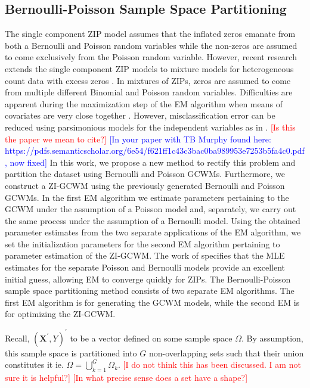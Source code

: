 \documentclass[11pt,letterpaper]{article}
\numberwithin{equation}{section}
\numberwithin{equation}{section}
\numberwithin{equation}{section}
\begin{document}
\subsection{Bernoulli-Poisson Sample Space Partitioning}

The single component ZIP model assumes that the inflated zeros emanate from both a Bernoulli and Poisson random variables while the non-zeros are assumed to come exclusively from the Poisson random variable. However, recent research  extends the single component ZIP models to mixture models for heterogeneous count data with excess zeros \citep[see][]{Bermudez+Karlis:2012}. In mixtures of ZIPs, zeros are assumed to come from multiple different Binomial and Poisson random variables. Difficulties are apparent  during the maximization step of the EM algorithm when means of covariates are very close together \cite[see][]{LimHwa}. However, misclassification error can be reduced using parsimonious models for the independent variables as in  \cite{McNicholas:2010}. \textcolor{red}{[Is this the paper we mean to cite?]} \textcolor{blue}{[In your paper with  TB Murphy found here: https://pdfs.semanticscholar.org/6e54/f621ff1c43c3bac0ba989953e7253b5fa4c0.pdf, now fixed]
}
	In this work, we propose a new method to rectify this problem and partition the dataset using Bernoulli and Poisson GCWMs. Furthermore, we construct a ZI-GCWM using the previously generated Bernoulli and Poisson GCWMs. In the first EM algorithm we estimate parameters pertaining to the GCWM under the assumption of a Poisson model and, separately, we carry out the same process under the assumption of a Bernoulli model. Using the obtained parameter estimates from the two separate applications of the EM algorithm, we set the initialization parameters for the second EM algorithm pertaining to parameter estimation of the ZI-GCWM. The work of \cite{Lambert} specifies that the MLE estimates for the separate Poisson and Bernoulli models provide an excellent initial guess, allowing EM to converge quickly for ZIPs. The Bernoulli-Poisson sample space partitioning method consists of two separate EM algorithms. The first EM algorithm is for generating the GCWM models, while the second EM is for optimizing the ZI-GCWM. 
	
	Recall, $(\bm {X^{'}}, Y)^{'}$ to be a vector defined on some sample space $\Omega$.   By assumption, this sample space is partitioned into $G$ non-overlapping sets such that their union constitutes it ie. $ \Omega = \bigcup_{k=1}^G \Omega_k $. \textcolor{red}{[I do not think this has been discussed. I am not sure it is helpful?]}  \textcolor{red}{[In what precise sense does a set have a shape?]} 
	
\end{document}
